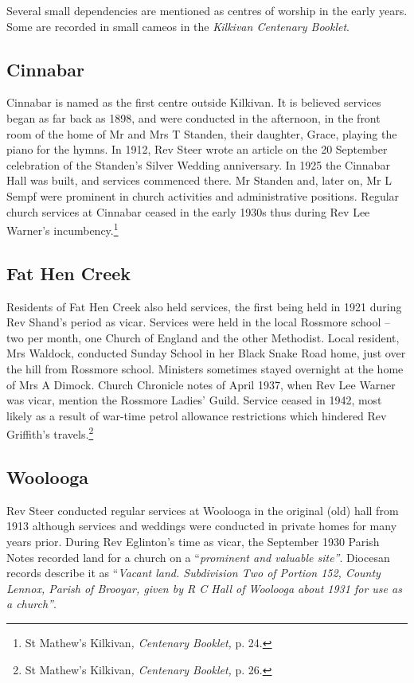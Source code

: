 Several small dependencies are mentioned as centres of worship in the early years. Some are recorded in small cameos in the \emph{Kilkivan Centenary Booklet}.

\hypertarget{cinnabar}{%
\subsection{Cinnabar}\label{cinnabar}}

Cinnabar is named as the first centre outside Kilkivan. It is believed services began as far back as 1898, and were conducted in the afternoon, in the front room of the home of Mr and Mrs T Standen, their daughter, Grace, playing the piano for the hymns. In 1912, Rev Steer wrote an article on the 20 September celebration of the Standen's Silver Wedding anniversary. In 1925 the Cinnabar Hall was built, and services commenced there. Mr Standen and, later on, Mr L Sempf were prominent in church activities and administrative positions. Regular church services at Cinnabar ceased in the early 1930s thus during Rev Lee Warner's incumbency.\footnote{St Mathew's Kilkivan\emph{, Centenary Booklet,} p. 24.}

\hypertarget{fat-hen-creek}{%
\subsection{Fat Hen Creek}\label{fat-hen-creek}}

Residents of Fat Hen Creek also held services, the first being held in 1921 during Rev Shand's period as vicar. Services were held in the local Rossmore school -- two per month, one Church of England and the other Methodist. Local resident, Mrs Waldock, conducted Sunday School in her Black Snake Road home, just over the hill from Rossmore school. Ministers sometimes stayed overnight at the home of Mrs A Dimock. Church Chronicle notes of April 1937, when Rev Lee Warner was vicar, mention the Rossmore Ladies' Guild. Service ceased in 1942, most likely as a result of war-time petrol allowance restrictions which hindered Rev Griffith's travels.\footnote{St Mathew's Kilkivan\emph{, Centenary Booklet,} p. 26.}

\hypertarget{woolooga}{%
\subsection{Woolooga}\label{woolooga}}

Rev Steer conducted regular services at Woolooga in the original (old) hall from 1913 although services and weddings were conducted in private homes for many years prior. During Rev Eglinton's time as vicar, the September 1930 Parish Notes recorded land for a church on a ``\emph{prominent and valuable site''}. Diocesan records describe it as ``\emph{Vacant land. Subdivision Two of Portion 152, County Lennox, Parish of Brooyar, given by R C Hall of Woolooga about 1931 for use as a church''}.

